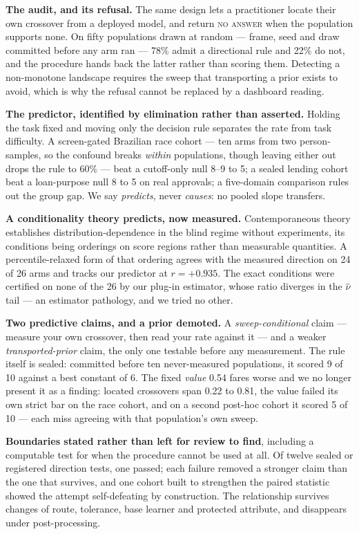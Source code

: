 \documentclass[conference]{IEEEtran}
\begin{document}
\textbf{The audit, and its refusal.} The same design lets a practitioner locate their own
crossover from a deployed model, and return \textsc{no answer} when the population supports
none. On fifty populations drawn at random --- frame, seed and draw committed before any arm
ran --- 78\% admit a directional rule and 22\% do not, and the procedure hands back the latter
rather than scoring them. Detecting a non-monotone landscape requires the sweep that
transporting a prior exists to avoid, which is why the refusal cannot be replaced by a
dashboard reading.

\textbf{The predictor, identified by elimination rather than asserted.} Holding the task fixed
and moving only the decision rule separates the rate from task difficulty. A screen-gated
Brazilian race cohort --- ten arms from two person-samples, so the confound breaks
\emph{within} populations, though leaving either out drops the rule to 60\% --- beat a
cutoff-only null 8--9 to 5; a sealed lending cohort beat a
loan-purpose null 8 to 5 on real approvals; a five-domain comparison rules out the group gap.
We say \emph{predicts}, never \emph{causes}: no pooled slope transfers.

\textbf{A conditionality theory predicts, now measured.} Contemporaneous theory
\cite{backfire2026} establishes distribution-dependence in the blind regime without
experiments, its conditions being orderings on score regions rather than measurable
quantities. A percentile-relaxed form of that ordering agrees with the measured direction on
24 of 26 arms and tracks our predictor at $r = +0.935$.
The exact conditions were certified on none of the 26 by our plug-in estimator, whose ratio
diverges in the $\hat\nu$ tail --- an estimator pathology, and we tried no other.

\textbf{Two predictive claims, and a prior demoted.} A \emph{sweep-conditional} claim ---
measure your own crossover, then read your rate against it --- and a weaker
\emph{transported-prior} claim, the only one testable before any measurement. The rule itself
is sealed: committed before ten never-measured populations, it scored 9 of 10 against a best
constant of 6. The fixed \emph{value} 0.54 fares worse and we no longer present it as a
finding: located crossovers span 0.22 to 0.81, the value failed its own strict bar on the race
cohort, and on a second post-hoc cohort it scored 5 of 10 --- each miss agreeing with that
population's own sweep.

\textbf{Boundaries stated rather than left for review to find}, including a computable test
for when the procedure cannot be used at all. Of twelve sealed or registered direction tests, one passed; each failure removed a stronger claim than the one that survives, and one cohort
built to strengthen the paired statistic showed the attempt self-defeating by construction.
The relationship survives changes of route, tolerance, base learner and protected attribute,
and disappears under post-processing.
\end{document}

